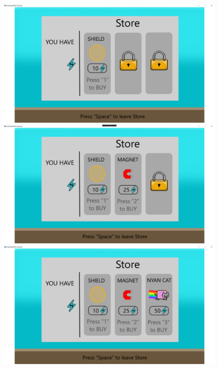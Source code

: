 \documentclass[10pt,conference,onecolumn,compsoc]{IEEEtran}
\begin{document}
\begin{figure}[!ht]
\centering
\includegraphics[scale=.2]{Store1.png}
\caption{}

\includegraphics[scale=.2]{Store2.png}
\caption{}

\includegraphics[scale=.2]{Store3.png}
\caption{}
\end{figure}

\clearpage
\end{document}
